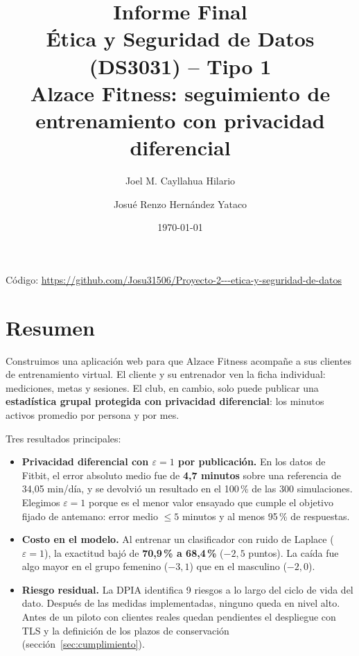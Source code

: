 \documentclass[11pt]{article}
\title{\textbf{Informe Final \\ Ética y Seguridad de Datos (DS3031) -- Tipo 1}\\
\large Alzace Fitness: seguimiento de entrenamiento con privacidad diferencial}
\author{Joel M. Cayllahua Hilario \and Josué Renzo Hernández Yataco}
\date{\today}
\begin{document}
\maketitle

\begin{center}
\small Código: \url{https://github.com/Josu31506/Proyecto-2---etica-y-seguridad-de-datos}
\end{center}

\setcounter{tocdepth}{1}
\tableofcontents
\newpage

\section{Resumen}

Construimos una aplicación web para que Alzace Fitness acompañe a sus clientes de entrenamiento virtual. El cliente y su entrenador ven la ficha individual: mediciones, metas y sesiones. El club, en cambio, solo puede publicar una \textbf{estadística grupal protegida con privacidad diferencial}: los minutos activos promedio por persona y por mes.

Tres resultados principales:
\begin{itemize}[nosep]
  \item \textbf{Privacidad diferencial con $\varepsilon = 1$ por publicación.} En los datos de Fitbit, el error absoluto medio fue de \textbf{4,7 minutos} sobre una referencia de 34,05 min/día, y se devolvió un resultado en el 100\,\% de las 300 simulaciones. Elegimos $\varepsilon = 1$ porque es el menor valor ensayado que cumple el objetivo fijado de antemano: error medio $\le 5$ minutos y al menos 95\,\% de respuestas.
  \item \textbf{Costo en el modelo.} Al entrenar un clasificador con ruido de Laplace ($\varepsilon = 1$), la exactitud bajó de \textbf{70,9\,\% a 68,4\,\%} ($-2{,}5$ puntos). La caída fue algo mayor en el grupo femenino ($-3{,}1$) que en el masculino ($-2{,}0$).
  \item \textbf{Riesgo residual.} La DPIA identifica 9 riesgos a lo largo del ciclo de vida del dato. Después de las medidas implementadas, ninguno queda en nivel alto. Antes de un piloto con clientes reales quedan pendientes el despliegue con TLS y la definición de los plazos de conservación (sección~\ref{sec:cumplimiento}).
\end{itemize}

\end{document}

